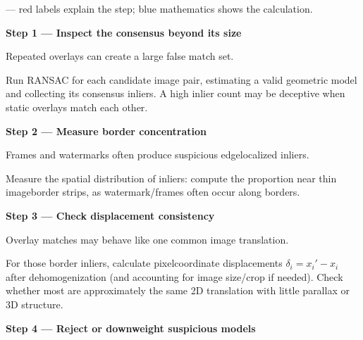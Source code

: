 \documentclass[letterpaper,11pt,english,openany,oneside]{jupyterBook}
\begin{document}
\par\medskip

\sphinxAtStartPar
{} — red labels explain the step; blue mathematics shows the calculation.

\par\medskip{}
{\color{QuizStepRed}\bfseries Step 1 — Inspect the consensus beyond its size}\par\smallskip

\sphinxAtStartPar
{} Repeated overlays can create a large false match set.

\sphinxAtStartPar
Run RANSAC for each candidate image pair, estimating a valid geometric model and collecting its consensus inliers. A high inlier count  may be deceptive when static overlays match each other.

\par

\par\medskip{}
{\color{QuizStepRed}\bfseries Step 2 — Measure border concentration}\par\smallskip

\sphinxAtStartPar
{} Frames and watermarks often produce suspicious edge\sphinxhyphen{}localized inliers.

\sphinxAtStartPar
Measure the spatial distribution of inliers: compute the proportion near thin image\sphinxhyphen{}border strips, as watermark/frames often occur along borders.

\par

\par\medskip{}
{\color{QuizStepRed}\bfseries Step 3 — Check displacement consistency}\par\smallskip

\sphinxAtStartPar
{} Overlay matches may behave like one common image translation.

\sphinxAtStartPar
For those border inliers, calculate pixel\sphinxhyphen{}coordinate displacements {\color{QuizMathBlue} \(\delta_i=x_i'-x_i\)} after dehomogenization (and accounting for image size/crop if needed). Check whether most are approximately the same 2D translation with little parallax or 3D structure.

\par

\par\medskip{}
{\color{QuizStepRed}\bfseries Step 4 — Reject or downweight suspicious models}\par\smallskip
\end{document}
